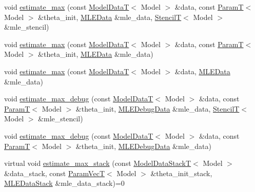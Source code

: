 \begin{DoxyCompactItemize}
\item 
void \hyperlink{classmappel_1_1estimator_1_1Estimator_a14b53d2ddc3d74a5653f71e4b5a97968}{estimate\+\_\+max} (const \hyperlink{namespacemappel_a97f050df953605381ae9c901c3b125f1}{Model\+DataT}$<$ Model $>$ \&data, const \hyperlink{namespacemappel_a667925cb0d6c0e49f2f035cc5a9a6857}{ParamT}$<$ Model $>$ \&theta\+\_\+init, \hyperlink{namespacemappel_1_1estimator_structmappel_1_1estimator_1_1MLEData}{M\+L\+E\+Data} \&mle\+\_\+data, \hyperlink{namespacemappel_a3a06598240007876f8c4bf834ad86197}{StencilT}$<$ Model $>$ \&mle\+\_\+stencil)
\item 
void \hyperlink{classmappel_1_1estimator_1_1Estimator_a8e1ea0bf9ef92871618c44a4cb770cb8}{estimate\+\_\+max} (const \hyperlink{namespacemappel_a97f050df953605381ae9c901c3b125f1}{Model\+DataT}$<$ Model $>$ \&data, const \hyperlink{namespacemappel_a667925cb0d6c0e49f2f035cc5a9a6857}{ParamT}$<$ Model $>$ \&theta\+\_\+init, \hyperlink{namespacemappel_1_1estimator_structmappel_1_1estimator_1_1MLEData}{M\+L\+E\+Data} \&mle\+\_\+data)
\item 
void \hyperlink{classmappel_1_1estimator_1_1Estimator_a8785a4f0e2d96fb4d30a533dc7541342}{estimate\+\_\+max} (const \hyperlink{namespacemappel_a97f050df953605381ae9c901c3b125f1}{Model\+DataT}$<$ Model $>$ \&data, \hyperlink{namespacemappel_1_1estimator_structmappel_1_1estimator_1_1MLEData}{M\+L\+E\+Data} \&mle\+\_\+data)
\item 
void \hyperlink{classmappel_1_1estimator_1_1Estimator_aca8f7fcc8d2754f55092e1dc33cff8a9}{estimate\+\_\+max\+\_\+debug} (const \hyperlink{namespacemappel_a97f050df953605381ae9c901c3b125f1}{Model\+DataT}$<$ Model $>$ \&data, const \hyperlink{namespacemappel_a667925cb0d6c0e49f2f035cc5a9a6857}{ParamT}$<$ Model $>$ \&theta\+\_\+init, \hyperlink{structmappel_1_1estimator_1_1MLEDebugData}{M\+L\+E\+Debug\+Data} \&mle\+\_\+data, \hyperlink{namespacemappel_a3a06598240007876f8c4bf834ad86197}{StencilT}$<$ Model $>$ \&mle\+\_\+stencil)
\item 
void \hyperlink{classmappel_1_1estimator_1_1Estimator_a2cb11ee4a6b01c38064b03d761840838}{estimate\+\_\+max\+\_\+debug} (const \hyperlink{namespacemappel_a97f050df953605381ae9c901c3b125f1}{Model\+DataT}$<$ Model $>$ \&data, const \hyperlink{namespacemappel_a667925cb0d6c0e49f2f035cc5a9a6857}{ParamT}$<$ Model $>$ \&theta\+\_\+init, \hyperlink{structmappel_1_1estimator_1_1MLEDebugData}{M\+L\+E\+Debug\+Data} \&mle\+\_\+data)
\item 
virtual void \hyperlink{classmappel_1_1estimator_1_1Estimator_af7afea557c4090fcd3fe848df984653e}{estimate\+\_\+max\+\_\+stack} (const \hyperlink{namespacemappel_aaeb6665bc57476dd93c2df6ad8bc4768}{Model\+Data\+StackT}$<$ Model $>$ \&data\+\_\+stack, const \hyperlink{namespacemappel_a0f86d3153e4e27b095012f140eea58de}{Param\+VecT}$<$ Model $>$ \&theta\+\_\+init\+\_\+stack, \hyperlink{namespacemappel_1_1estimator_structmappel_1_1estimator_1_1MLEDataStack}{M\+L\+E\+Data\+Stack} \&mle\+\_\+data\+\_\+stack)=0

\end{DoxyCompactItemize}
